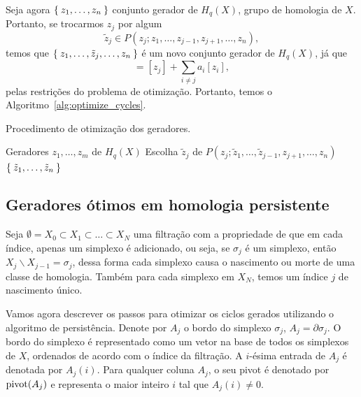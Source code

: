 Seja agora $\Set{z_1, \dots, z_n}$ conjunto gerador de $H_q(X)$, grupo de homologia
de $X$. Portanto, se trocarmos $z_j$ por algum
\begin{equation*}
    \tilde{z}_j \in P(z_j; z_1, \dots, z_{j-1}, z_{j+1}, \dots, z_n),
\end{equation*}
temos que $\Set{z_1, \dots, \tilde{z}_j, \dots, z_n}$ é um novo conjunto gerador 
de $H_q(X)$, já que 
\begin{equation*}
    [\tilde{z}_j] = [z_j] + \sum_{i\neq j} a_i [z_i],
\end{equation*}
pelas restrições do problema de otimização. Portanto, temos o Algoritmo~\ref{alg:optimize_cycles}.
\begin{algoritmo}[!htpb]
  \caption{Procedimento de otimização dos geradores.}
  \label{alg:optimize_cycles}
  \begin{algorithmic}[1]
    \Require Geradores $z_1, \dots, z_m$ de $H_q(X)$
        \State Escolha $\tilde{z}_j$ de $P(z_j; \tilde{z}_1, \dots,
         \tilde{z}_{j-1}, z_{j+1}, \dots, z_n)$
    \EndFor    
    \State \Return $\Set{\tilde{z}_1, \dots, \tilde{z}_n}$
    \EndFunction
  \end{algorithmic}
\end{algoritmo}


\subsection{Geradores ótimos em homologia persistente}

Seja $\emptyset = X_0 \subset X_1 \subset \dots \subset X_N$ uma filtração com a propriedade de que 
em cada índice, apenas um simplexo é adicionado, ou seja, se $\sigma_j$ é um simplexo, então
$X_j \backslash X_{j-1} = \sigma_j$, dessa forma cada simplexo causa o nascimento ou morte de uma 
classe de homologia. Também para cada simplexo em $X_N$, temos um índice $j$ de nascimento único. 

Vamos agora descrever os passos para otimizar os ciclos gerados utilizando o algoritmo de persistência.
Denote por $A_j$ o bordo do simplexo $\sigma_j$, $A_j = \partial \sigma_j$. O bordo do simplexo é
representado como um vetor na base de todos os simplexos de $X$, ordenados de acordo com o índice da
filtração. A $i$-ésima entrada de $A_j$ é denotada por $A_j(i)$. Para qualquer coluna
$A_j$, o seu pivot é denotado por $\text{pivot}(A_j)$ e representa o maior inteiro $i$ tal que 
$A_j(i) \neq 0$.

